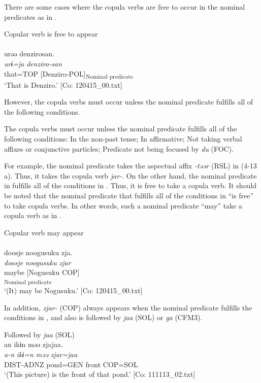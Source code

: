 There are some cases where the copula verbs are free to occur in the nominal predicates as in .

\ea  Copular verb is free to appear \label{ex:4.14}\\\\
\glll    urəə  denzirosan.\\
    \textit{urɨ=ja}  \textit{denziro-san}\\
    that=TOP  [Denziro-POL]\textsubscript{Nominal predicate}\\
    \glt     ‘That is Denziro.’ [Co: 120415\_00.txt]
\z

However, the copula verbs must occur unless the nominal predicate fulfills all of the following conditions.

\ea  The copula verbs must occur unless the nominal predicate fulfills all of the following conditions: \label{ex:4.15}
  \ea  In the non-past tense;
  \ex  In affirmative;
  \ex  Not taking verbal affixes or conjunctive particles;
  \ex  Predicate not being focused by \textit{du} (FOC).
  \z
\z

For example, the nominal predicate takes the aspectual affix \textit{{}-təər} (RSL) in (4-13 a). Thus, it takes the copula verb \textit{jar-}. On the other hand, the nominal predicate in  fulfills all of the conditions in . Thus, it is free to take a copula verb. It should be noted that the nominal predicate that fulfills all of the conditions in  “is free” to take copula verbs. In other words, such a nominal predicate “may” take a copula verb as in .

\ea  Copular verb may appear \label{ex:4.16}\\\\
\gllll    doosje  noogusuku  zja.\\
    \textit{doosje}  \textit{noogusuku}  \textit{zjar}\\
    maybe  [Nogusuku  COP]\\
      [NP  Copular verb]\textsubscript{Nominal predicate}\\
    \glt     ‘(It) may be Nogusuku.’ [Co: 120415\_00.txt]
\z

  In addition, \textit{zjar-} (COP) always appears when the nominal predicate fulfills the conditions in , and also is followed by \textit{jaa} (SOL) or \textit{ga} (CFM3).

\ea  Followed by \textit{jaa} (SOL) \label{ex:4.17}\\
\glll  an  ikɨn  məə  zjajaa.\\
    \textit{a-n}  \textit{ikɨ=n}  \textit{məə}  \textit{zjar=jaa}\\
    DIST-ADNZ  pond=GEN  front  COP=SOL\\
    \glt     ‘(This picture) is the front of that pond.’ [Co: 111113\_02.txt]
\z

